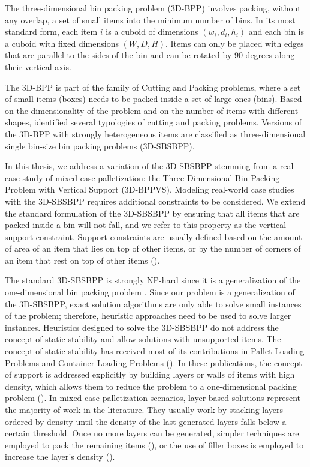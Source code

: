The three-dimensional bin packing problem (3D-BPP) involves packing, without any overlap, a set of small items into the minimum number of bins.
In its most standard form, each item $i$ is a cuboid of dimensions $(w_i, d_i, h_i)$ and each bin is a cuboid with fixed dimensions $(W, D, H)$.
Items can only be placed with edges that are parallel to the sides of the bin and can be rotated by $90$ degrees along their vertical axis.

The 3D-BPP is part of the family of Cutting and Packing problems, where a set of small items (boxes) needs to be packed inside a set of large ones (bins).
Based on the dimensionality of the problem and on the number of items with different shapes, \cite{WASCHER20071109} identified several typologies of cutting and packing problems.
Versions of the 3D-BPP with strongly heterogeneous items are classified as three-dimensional single bin-size bin packing problems (3D-SBSBPP). 

In this thesis, we address a variation of the 3D-SBSBPP stemming from a real case study of mixed-case palletization: the Three-Dimensional Bin Packing Problem with Vertical Support (3D-BPPVS).
Modeling real-world case studies with the 3D-SBSBPP requires additional constraints to be considered. We extend the standard formulation of the 3D-SBSBPP by ensuring that all items that are packed inside a bin will not fall, and we refer to this property as the vertical support constraint.
Support constraints are usually defined based on the amount of area of an item that lies on top of other items, or by the number of corners of an item that rest on top of other items (\cite{GZARA20201062, paquay2016mixed, kurpel2020exact}).

The standard 3D-SBSBPP is strongly NP-hard since it is a generalization of the one-dimensional bin packing problem \citep{martello2000three}.
Since our problem is a generalization of the 3D-SBSBPP, exact solution algorithms are only able to solve small instances of the problem; therefore, heuristic approaches need to be used to solve larger instances.
Heuristics designed to solve the 3D-SBSBPP do not address the concept of static stability and allow solutions with unsupported items.
The concept of static stability has received most of its contributions in Pallet Loading Problems and Container Loading Problems (\cite{Calzavara2021, kurpel2020exact}).
In these publications, the concept of support is addressed explicitly by building layers or walls of items with high density, which allows them to reduce the problem to a one-dimensional packing problem (\cite{BORTFELDT20131}).
In mixed-case palletization scenarios, layer-based solutions represent the majority of work in the literature. They usually work by stacking layers ordered by density until the density of the last generated layers falls below a certain threshold.
Once no more layers can be generated, simpler techniques are employed to pack the remaining items (\cite{elhedhli2019three}), or the use of filler boxes is employed to increase the layer's density (\cite{Calzavara2021}).


